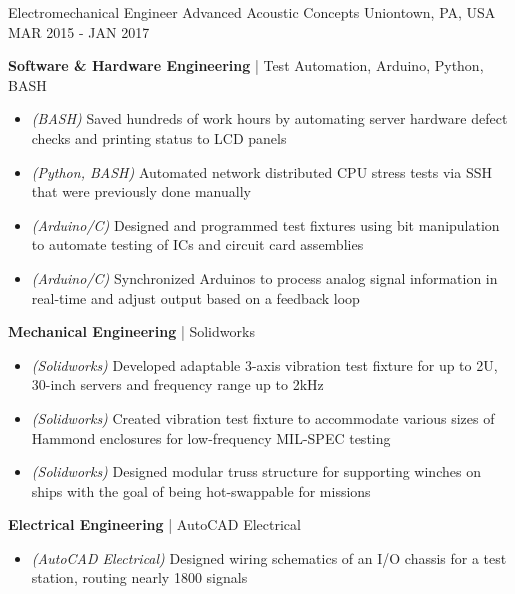 \begin{cventries}
	\cventry
	{Electromechanical Engineer} %
	{Advanced Acoustic Concepts} %
	{Uniontown, PA, USA} %
	{MAR 2015 - JAN 2017} %
	{
		\begin{cvitems} %
			\item {\textbf{Software \& Hardware Engineering} | {\color{awesome}Test Automation, Arduino, Python, BASH}
				\begin{itemize}[noitemsep,wide=0pt, leftmargin=\dimexpr{} + 2\relax]
					\item[\textbullet]{\textit{(BASH)} Saved hundreds of work hours by automating server hardware defect checks and printing status to LCD panels}
					\item[\textbullet]{\textit{(Python, BASH)} Automated network distributed CPU stress tests via SSH that were previously done manually}
					\item[\textbullet]{\textit{(Arduino/C)} Designed and programmed test fixtures using bit manipulation to automate testing of ICs and circuit card assemblies}
					\item[\textbullet]{\textit{(Arduino/C)} Synchronized Arduinos to process analog signal information in real-time and adjust output based on a feedback loop}
				\end{itemize}}
			\item {\textbf{Mechanical Engineering} | {\color{awesome}Solidworks}
				\begin{itemize}[noitemsep,wide=0pt, leftmargin=\dimexpr{} + 2\relax]
					\item[\textbullet]{\textit{(Solidworks)} Developed adaptable 3-axis vibration test fixture for up to 2U, 30-inch servers and frequency range up to 2kHz}
					\item[\textbullet]{\textit{(Solidworks)} Created vibration test fixture to accommodate various sizes of Hammond enclosures for low-frequency MIL-SPEC testing}
					\item[\textbullet]{\textit{(Solidworks)} Designed modular truss structure for supporting winches on ships with the goal of being hot-swappable for missions}
				\end{itemize}}
			\item {\textbf{Electrical Engineering} | {\color{awesome}AutoCAD Electrical}
				\begin{itemize}[noitemsep,wide=0pt, leftmargin=\dimexpr{} + 2\relax]
					\item[\textbullet]{\textit{(AutoCAD Electrical)} Designed wiring schematics of an I/O chassis for a test station, routing nearly 1800 signals}

\end{itemize}}
\end{cvitems}}
\end{cventries}
